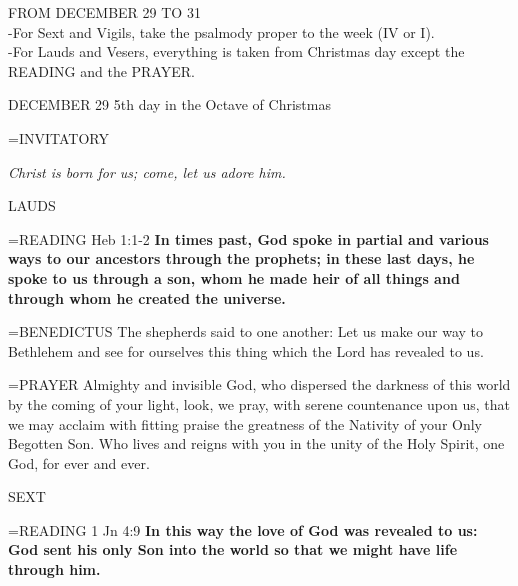 \begin{center}\normalsize FROM DECEMBER 29 TO 31\\
\footnotesize -For Sext and Vigils, take the psalmody proper to the week (IV or I).\\
\footnotesize -For Lauds and Vesers, everything is taken from Christmas day except the READING and the PRAYER.\\
\end{center}

DECEMBER 29
5th day in the Octave of Christmas

\hangindent=\parindent \small{INVITATORY	}
\begin{center}
\textit{Christ is born for us; come, let us adore him.\\}
\end{center}

\begin{flushleft}\normalsize LAUDS\\\end{flushleft}

\hangindent=\parindent \small{\uppercase{READING}}    Heb 1:1-2 \textbf{   In times past, God spoke in partial and various ways to our ancestors through the prophets; in these last days, he spoke to us through a son, whom he made heir of all things and through whom he created the universe.\\}

\hangindent=\parindent \small{BENEDICTUS 	The shepherds said to one another: Let us make our way to Bethlehem and see for ourselves this thing which the Lord has revealed to us.\\}

\hangindent=\parindent \small{PRAYER 	Almighty and invisible God, who dispersed the darkness of this world by the coming of your light, look, we pray, with serene countenance upon us, that we may acclaim with fitting praise the greatness of the Nativity of your Only Begotten Son. Who lives and reigns with you in the unity of the Holy Spirit, one God, for ever and ever.}

\begin{flushleft}\normalsize SEXT\\\end{flushleft}

\hangindent=\parindent \small{\uppercase{READING}}    1 Jn 4:9 \textbf{    In this way the love of God was revealed to us: God sent his only Son into the world so that we might have life through him.\\}

